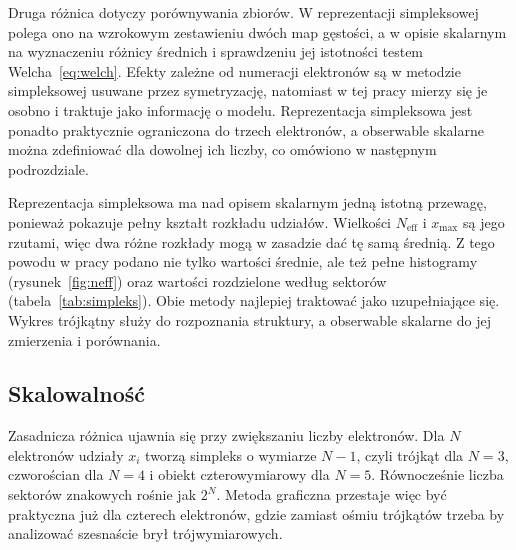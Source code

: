 \documentclass[12pt,a4paper]{article}
\newcommand{\Neff}{N_{\mathrm{eff}}}
\newcommand{\xmax}{x_{\max}}
\begin{document}
Druga różnica dotyczy porównywania zbiorów. W reprezentacji
simpleksowej polega ono na wzrokowym zestawieniu dwóch map gęstości,
a w opisie skalarnym na wyznaczeniu różnicy średnich i sprawdzeniu jej
istotności testem Welcha~\eqref{eq:welch}. Efekty zależne od numeracji
elektronów są w metodzie simpleksowej usuwane przez symetryzację,
natomiast w tej pracy mierzy się je osobno i traktuje jako informację
o modelu. Reprezentacja simpleksowa jest ponadto praktycznie
ograniczona do trzech elektronów, a obserwable skalarne można
zdefiniować dla dowolnej ich liczby, co omówiono w następnym
podrozdziale.

Reprezentacja simpleksowa ma nad opisem skalarnym jedną istotną
przewagę, ponieważ pokazuje pełny kształt rozkładu udziałów. Wielkości
$\Neff$ i $\xmax$ są jego rzutami, więc dwa różne rozkłady mogą
w zasadzie dać tę samą średnią. Z tego powodu w pracy podano nie tylko
wartości średnie, ale też pełne histogramy (rysunek~\ref{fig:neff})
oraz wartości rozdzielone według sektorów (tabela~\ref{tab:simpleks}).
Obie metody najlepiej traktować jako uzupełniające się. Wykres
trójkątny służy do rozpoznania struktury, a obserwable skalarne do jej
zmierzenia i porównania.


\subsection{Skalowalność}


Zasadnicza różnica ujawnia się przy zwiększaniu liczby elektronów. Dla
$N$ elektronów udziały $x_i$ tworzą simpleks o wymiarze $N-1$, czyli
trójkąt dla $N=3$, czworościan dla $N=4$ i obiekt czterowymiarowy dla
$N=5$. Równocześnie liczba sektorów znakowych rośnie jak $2^N$. Metoda
graficzna przestaje więc być praktyczna już dla czterech elektronów,
gdzie zamiast ośmiu trójkątów trzeba by analizować szesnaście brył
trójwymiarowych.
\end{document}
